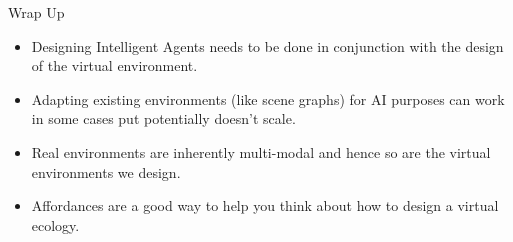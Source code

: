 \documentclass[xcolor=dvipsnames,t]{beamer}
\begin{document}
\begin{frame}{Wrap Up} 
\begin{itemize} 
    \item Designing Intelligent Agents needs to be done in conjunction with the
    design of the virtual environment.
    \item Adapting existing environments (like scene graphs) for AI purposes
    can work in some cases put potentially doesn't scale. 
    \item Real environments are inherently multi-modal and hence so are the
    virtual environments we design. 
    \item Affordances are a good way to help you think about how to design a
    virtual ecology.
\end{itemize} 
\end{frame} 
\end{document}
